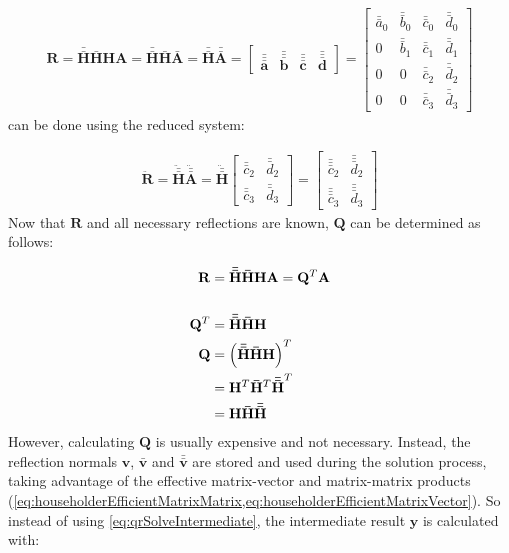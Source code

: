 \begin{align}
\mathbf{R}
= 
\mathbf{\bar{\bar{H}}}\mathbf{\bar{H}}\mathbf{H}\mathbf{A} 
= 
\mathbf{\bar{\bar{H}}}\mathbf{\bar{H}}\mathbf{\bar{A}}
= 
\mathbf{\bar{\bar{H}}}\mathbf{\bar{\bar{A}}}
=
\begin{bmatrix}
\mathbf{\bar{\bar{\bar{a}}}}&\mathbf{\bar{\bar{\bar{b}}}}&\mathbf{\bar{\bar{\bar{c}}}}&\mathbf{\bar{\bar{\bar{d}}}}
\end{bmatrix}	
=
\begin{bmatrix}
\bar{\bar{a}}_0&\bar{\bar{b}}_0&\bar{\bar{c}}_0&\bar{\bar{d}}_0\\
0              &\bar{\bar{b}}_1&\bar{\bar{c}}_1&\bar{\bar{d}}_1\\
0              &0              &\bar{\bar{c}}_2&\bar{\bar{d}}_2\\
0              &0              &\bar{\bar{c}}_3&\bar{\bar{d}}_3
\end{bmatrix}					  
\end{align}
%
can be done using the reduced system:

\begin{align}
\mathbf{\ddot{R}}
= 
\mathbf{\ddot{\bar{\bar{H}}}}\mathbf{\ddot{\bar{\bar{A}}}}
=
\mathbf{\ddot{\bar{\bar{H}}}}
\begin{bmatrix}
\bar{\bar{c}}_2&\bar{\bar{d}}_2\\
\bar{\bar{c}}_3&\bar{\bar{d}}_3
\end{bmatrix}	
=
\begin{bmatrix}
\bar{\bar{\bar{c}}}_2&\bar{\bar{\bar{d}}}_2\\
\bar{\bar{\bar{c}}}_3&\bar{\bar{\bar{d}}}_3
\end{bmatrix}					  
\end{align}
%
Now that $\mathbf{R}$ and all necessary reflections are known, $\mathbf{Q}$ can be determined as follows:

\begin{align}
\mathbf{R} &= \mathbf{\bar{\bar{H}}}\mathbf{\bar{H}}\mathbf{H}\mathbf{A} = \mathbf{Q}^T\mathbf{A}
\\
\\
\mathbf{Q}^T &= \mathbf{\bar{\bar{H}}}\mathbf{\bar{H}}\mathbf{H}\\
\nonumber
\mathbf{Q}   &= \left(\mathbf{\bar{\bar{H}}}\mathbf{\bar{H}}\mathbf{H}\right)^T\\
\nonumber
&= \mathbf{H}^T\mathbf{\bar{H}}^T\mathbf{\bar{\bar{H}}}^T\\
&= \mathbf{H}\mathbf{\bar{H}}\mathbf{\bar{\bar{H}}}
\end{align}
%
However, calculating $\mathbf{Q}$ is usually expensive and not necessary. Instead, the reflection normals $\mathbf{v}$, $\mathbf{\bar{v}}$ and $\mathbf{\bar{\bar{v}}}$ are stored and used during the solution process, taking advantage of the effective matrix-vector and matrix-matrix products (\cref{eq:householderEfficientMatrixMatrix,eq:householderEfficientMatrixVector}).
So instead of using \cref{eq:qrSolveIntermediate}, the intermediate result $\mathbf{y}$ is calculated with:

